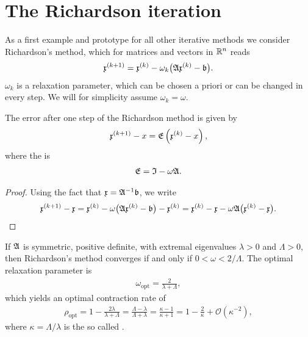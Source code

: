 
\section{The Richardson iteration}

\begin{intro}
  As a first example and prototype for all other iterative methods we
  consider Richardson's method, which for matrices and vectors in
  $\mathbb R^n$ reads
  \begin{gather}
    \label{eq:richardson:1}
    \mathfrak{x}^{(k+1)}
    = \mathfrak{x}^{(k)}
    - \omega_k \bigl(\mathfrak{A} \mathfrak{x}^{(k)} - \mathfrak{b} \bigr).
  \end{gather}
  $\omega_k$ is a relaxation parameter, which can be chosen a priori
  or can be changed in every step. We will for simplicity assume
  $\omega_k = \omega$.
\end{intro}  

\begin{lemma}
  \label{lemma:richardson:1}
  The error after one step of the Richardson method is given by
  \begin{gather}
    \label{eq:richardson:14}
    \mathfrak{x}^{(k+1)} - x = \mathfrak{E} \left(
      \mathfrak{x}^{(k)} - x \right),
  \end{gather}
  where the  is
  \begin{gather}
    \label{eq:richardson:15}
    \mathfrak{E} = \mathfrak{I} - \omega \mathfrak{A}.
  \end{gather}
\end{lemma}

\begin{proof}
  Using the fact that $\mathfrak{x} = \mathfrak{A}^{-1} \mathfrak{b}$, we write
  \begin{gather*}
    \mathfrak{x}^{(k+1)} - \mathfrak{x} 
    = \mathfrak{x}^{(k)}
    - \omega \bigl(\mathfrak{A} \mathfrak{x}^{(k)} - \mathfrak{b} \bigr) -  \mathfrak{x}^{(k)}
    =  \mathfrak{x}^{(k)} - \mathfrak{x} - \omega \mathfrak{A} \bigl(
     \mathfrak{x}^{(k)} -  \mathfrak{x} \bigr).
  \end{gather*}
\end{proof}

\begin{theorem}
  \label{theorem:richardson:1}
  If $\mathfrak{A}$ is symmetric, positive definite, with extremal
  eigenvalues $\lambda>0$ and $\Lambda>0$, then Richardson's method
  converges if and only if $0 < \omega < 2/\Lambda$. The optimal
  relaxation parameter is 
  \begin{gather}
    \label{eq:richardson:2}
    \omega_{\text{opt}} = \frac{2}{\lambda+\Lambda},
  \end{gather}
  which yields an optimal contraction rate of
  \begin{gather}
    \label{eq:richardson:4}
    \rho_{\text{opt}}
    = 1-\frac{2\lambda}{\lambda+\Lambda}
    = \frac{\Lambda-\lambda}{\Lambda+\lambda}
    = \frac{\kappa-1}{\kappa+1}
    = 1 -\frac2\kappa + \mathcal
    O\left(\kappa^{-2}\right),
  \end{gather}
  where $\kappa = \Lambda/\lambda$ is the so called .
\end{theorem}

